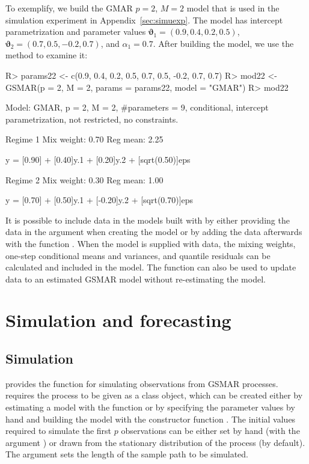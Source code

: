 \documentclass[nojss]{jss} %
\begin{document}
To exemplify, we build the GMAR $p=2$, $M=2$ model that is used in the simulation experiment in Appendix~\ref{sec:simuexp}. The model has intercept parametrization and parameter values $\boldsymbol{\vartheta}_1 = (0.9, 0.4, 0.2, 0.5)$, $\boldsymbol{\vartheta}_2 = (0.7, 0.5, -0.2, 0.7)$, and $\alpha_1 = 0.7$. After building the model, we use the  method to examine it:
%
\begin{CodeChunk}
\begin{CodeInput}
R> params22 <- c(0.9, 0.4, 0.2, 0.5, 0.7, 0.5, -0.2, 0.7, 0.7)
R> mod22 <- GSMAR(p = 2, M = 2, params = params22, model = "GMAR")
R> mod22
\end{CodeInput}
\begin{CodeOutput}
Model:
 GMAR, p = 2, M = 2, #parameters = 9,
 conditional, intercept parametrization, not restricted, no constraints.

Regime 1
Mix weight: 0.70
Reg mean: 2.25

y = [0.90] + [0.40]y.1 + [0.20]y.2 + [sqrt(0.50)]eps

Regime 2
Mix weight: 0.30
Reg mean: 1.00

y = [0.70] + [0.50]y.1 + [-0.20]y.2 + [sqrt(0.70)]eps
\end{CodeOutput}
\end{CodeChunk}
%

It is possible to include data in the models built with  by either providing the data in the argument  when creating the model or by adding the data afterwards with the function . When the model is supplied with data, the mixing weights, one-step conditional means and variances, and quantile residuals can be calculated and included in the model. The function  can also be used to update data to an estimated GSMAR model without re-estimating the model.

\section{Simulation and forecasting}\label{sec:simufore}

\subsection{Simulation}\label{sec:simu}
 provides the function  for simulating observations from GSMAR processes.  requires the process to be given as a class  object, which can be created either by estimating a model with the function  or by specifying the parameter values by hand and building the model with the constructor function . The initial values required to simulate the first $p$ observations can be either set by hand (with the argument ) or drawn from the stationary distribution of the process (by default). The argument  sets the length of the sample path to be simulated.
\end{document}
